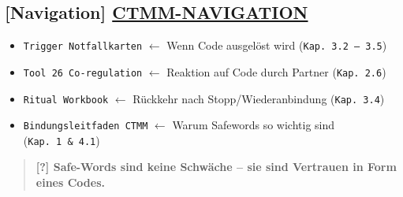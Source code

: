 \hypertarget{ctmm-navigation}{%
\subsection{\texorpdfstring{[Navigation] \textbf{\ul{CTMM-NAVIGATION}}}{[Navigation] CTMM-NAVIGATION}}\label{ctmm-navigation}}

\begin{itemize}
\tightlist
\item
  \texttt{T}\texttt{rigger}\texttt{\ }\texttt{N}\texttt{otfallkarten} $\leftarrow$ Wenn Code ausgelöst wird (\texttt{Kap.}\texttt{\ }\texttt{3.2\ --\ 3.5})
\item
  \texttt{T}\texttt{ool}\texttt{\ }\texttt{26}\texttt{\ C}\texttt{o}\texttt{-}\texttt{regulation} $\leftarrow$ Reaktion auf Code durch Partner (\texttt{Kap.}\texttt{\ }\texttt{2.6})
\item
  \texttt{R}\texttt{itual}\texttt{\ W}\texttt{orkbook} $\leftarrow$ Rückkehr nach Stopp/Wiederanbindung (\texttt{Kap.}\texttt{\ }\texttt{3.4})
\item
  \texttt{B}\texttt{indungsleitfaden}\texttt{\ CTMM} $\leftarrow$ Warum Safewords so wichtig sind (\texttt{Kap.\ }\texttt{1}\texttt{\ }\texttt{\&}\texttt{\ }\texttt{4.1})
\end{itemize}

\begin{quote}
\textbf{[?] Safe-Words sind keine Schwäche -- sie sind Vertrauen in Form eines Codes.}
\end{quote}
